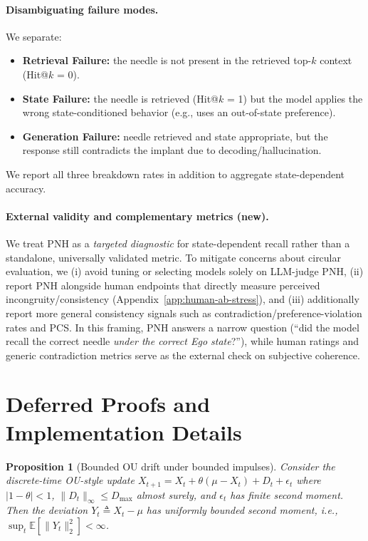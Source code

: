 \documentclass[11pt]{article}
\newtheorem{proposition}{Proposition}
\begin{document}
\paragraph{Disambiguating failure modes.}
We separate:
\begin{itemize}
  \item \textbf{Retrieval Failure:} the needle is not present in the retrieved top-$k$ context (Hit@$k$ = 0).
  \item \textbf{State Failure:} the needle is retrieved (Hit@$k$ = 1) but the model applies the wrong state-conditioned behavior (e.g., uses an out-of-state preference).
  \item \textbf{Generation Failure:} needle retrieved and state appropriate, but the response still contradicts the implant due to decoding/hallucination.
\end{itemize}
We report all three breakdown rates in addition to aggregate state-dependent accuracy.

\paragraph{External validity and complementary metrics (new).}
We treat PNH as a \emph{targeted diagnostic} for state-dependent recall rather than a standalone, universally validated metric.
To mitigate concerns about circular evaluation, we (i) avoid tuning or selecting models solely on LLM-judge PNH, (ii) report PNH alongside human endpoints that directly measure perceived incongruity/consistency (Appendix~\ref{app:human-ab-stress}), and (iii) additionally report more general consistency signals such as contradiction/preference-violation rates and PCS.
In this framing, PNH answers a narrow question (``did the model recall the correct needle \emph{under the correct Ego state}?''), while human ratings and generic contradiction metrics serve as the external check on subjective coherence.

\section{Deferred Proofs and Implementation Details}
\label{app:deferred-proofs}

\begin{proposition}[Bounded OU drift under bounded impulses]
\label{thm:stability}
Consider the discrete-time OU-style update
$X_{t+1} = X_t + \theta(\mu - X_t) + D_t + \epsilon_t$ where $|1-\theta|<1$, $\|D_t\|_\infty\le D_{\max}$ almost surely, and $\epsilon_t$ has finite second moment. Then the deviation $Y_t \triangleq X_t-\mu$ has uniformly bounded second moment, i.e., $\sup_t \mathbb{E}[\|Y_t\|_2^2] < \infty$.
\end{proposition}
\end{document}
